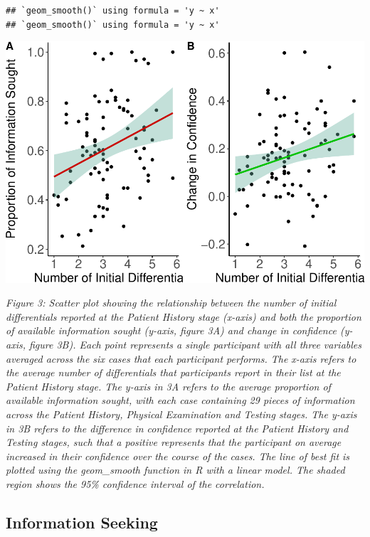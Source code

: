 \documentclass[a4paper, nobind]{templates/ociamthesis}
\begin{document}
\begin{verbatim}
## `geom_smooth()` using formula = 'y ~ x'
## `geom_smooth()` using formula = 'y ~ x'
\end{verbatim}

\begin{center}\includegraphics[width=1\linewidth]{_main_files/figure-latex/initialDiffsPlot-1} \end{center}

\emph{Figure 3: Scatter plot showing the relationship between the number of initial differentials reported at the Patient History stage (x-axis) and both the proportion of available information sought (y-axis, figure 3A) and change in confidence (y-axis, figure 3B). Each point represents a single participant with all three variables averaged across the six cases that each participant performs. The x-axis refers to the average number of differentials that participants report in their list at the Patient History stage. The y-axis in 3A refers to the average proportion of available information sought, with each case containing 29 pieces of information across the Patient History, Physical Examination and Testing stages. The y-axis in 3B refers to the difference in confidence reported at the Patient History and Testing stages, such that a positive represents that the participant on average increased in their confidence over the course of the cases. The line of best fit is plotted using the geom\_smooth function in R with a linear model. The shaded region shows the 95\% confidence interval of the correlation.}

\subsection*{Information Seeking}\label{information-seeking-1}
\end{document}

